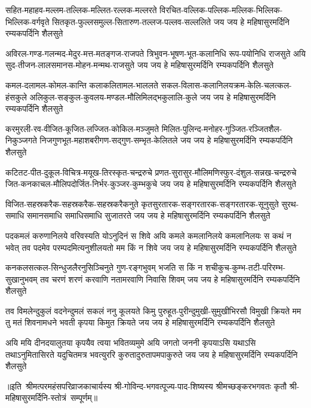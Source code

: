 \fourlineindentedshloka
{सहित-महाहव-मल्लम-तल्लिक-मल्लित-रल्लक-मल्लरते}
{विरचित-वल्लिक-पल्लिक-मल्लिक-भिल्लिक-भिल्लिक-वर्गवृते}
{सितकृत-फुल्लसमुल्ल-सितारुण-तल्लज-पल्लव-सल्ललिते}
{जय जय हे महिषासुरमर्दिनि रम्यकपर्दिनि शैलसुते}

\fourlineindentedshloka
{अविरल-गण्ड-गलन्मद-मेदुर-मत्त-मतङ्गज-राजपते}
{त्रिभुवन-भूषण-भूत-कलानिधि रूप-पयोनिधि राजसुते}
{अयि सुद-तीजन-लालसमानस-मोहन-मन्मथ-राजसुते}
{जय जय हे महिषासुरमर्दिनि रम्यकपर्दिनि शैलसुते}

\fourlineindentedshloka
{कमल-दलामल-कोमल-कान्ति कलाकलितामल-भाललते}
{सकल-विलास-कलानिलयक्रम-केलि-चलत्कल-हंसकुले}
{अलिकुल-सङ्कुल-कुवलय-मण्डल-मौलिमिलद्भकुलालि-कुले}
{जय जय हे महिषासुरमर्दिनि रम्यकपर्दिनि शैलसुते}

\fourlineindentedshloka
{करमुरली-रव-वीजित-कूजित-लज्जित-कोकिल-मञ्जुमते}
{मिलित-पुलिन्द-मनोहर-गुञ्जित-रञ्जितशैल-निकुञ्जगते}
{निजगुणभूत-महाशबरीगण-सद्गुण-सम्भृत-केलितले}
{जय जय हे महिषासुरमर्दिनि रम्यकपर्दिनि शैलसुते}

\fourlineindentedshloka
{कटितट-पीत-दुकूल-विचित्र-मयूख-तिरस्कृत-चन्द्ररुचे}
{प्रणत-सुरासुर-मौलिमणिस्फुर-दंशुल-सन्नख-चन्द्ररुचे}
{जित-कनकाचल-मौलिपदोर्जित-निर्भर-कुञ्जर-कुम्भकुचे}
{जय जय हे महिषासुरमर्दिनि रम्यकपर्दिनि शैलसुते}

\fourlineindentedshloka
{विजित-सहस्रकरैक-सहस्रकरैक-सहस्रकरैकनुते}
{कृतसुरतारक-सङ्गरतारक-सङ्गरतारक-सूनुसुते}
{सुरथ-समाधि समानसमाधि समाधिसमाधि सुजातरते}
{जय जय हे महिषासुरमर्दिनि रम्यकपर्दिनि शैलसुते}

\fourlineindentedshloka
{पदकमलं करुणानिलये वरिवस्यति योऽनुदिनं स शिवे}
{अयि कमले कमलानिलये कमलानिलयः स कथं न भवेत्}
{तव पदमेव परम्पदमित्यनुशीलयतो मम किं न शिवे}
{जय जय हे महिषासुरमर्दिनि रम्यकपर्दिनि शैलसुते}

\fourlineindentedshloka
{कनकलसत्कल-सिन्धुजलैरनुसिञ्चिनुते गुण-रङ्गभुवम्}
{भजति स किं न शचीकुच-कुम्भ-तटी-परिरम्भ-सुखानुभवम्}
{तव चरणं शरणं करवाणि नतामरवाणि निवासि शिवम्}
{जय जय हे महिषासुरमर्दिनि रम्यकपर्दिनि शैलसुते}

\fourlineindentedshloka
{तव विमलेन्दुकुलं वदनेन्दुमलं सकलं ननु कूलयते}
{किमु पुरुहूत-पुरीन्दुमुखी-सुमुखीभिरसौ विमुखी क्रियते}
{मम तु मतं शिवनामधने भवती कृपया किमुत क्रियते}
{जय जय हे महिषासुरमर्दिनि रम्यकपर्दिनि शैलसुते}

\fourlineindentedshloka
{अयि मयि दीनदयालुतया कृपयैव त्वया भवितव्यमुमे}
{अयि जगतो जननी कृपयाऽसि यथाऽसि तथाऽनुमितासिरते}
{यदुचितमत्र भवत्युररि कुरुतादुरुतापमपाकुरुते}
{जय जय हे महिषासुरमर्दिनि रम्यकपर्दिनि शैलसुते}

॥इति~श्रीमत्परमहंसपरिव्राजकाचार्यस्य श्री-गोविन्द-भगवत्पूज्य-पाद-शिष्यस्य 
श्रीमच्छङ्करभगवतः कृतौ  श्री-महिषासुरमर्दिनि-स्तोत्रं~सम्पूर्णम्॥
\setlength{\shlokaspaceskip}{24pt}